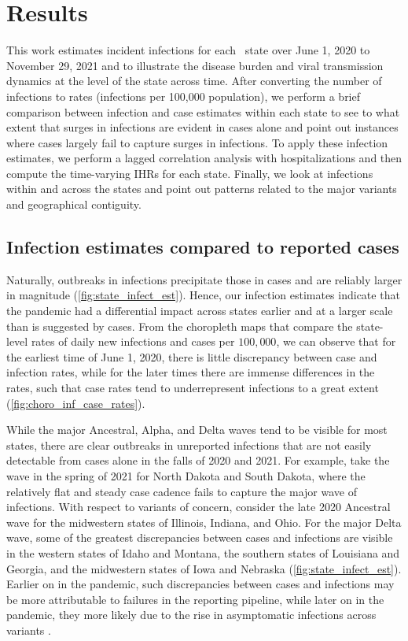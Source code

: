 \documentclass{article}
\begin{document}
\section{Results}

This work estimates incident infections for each \US\ state over June 1,
2020 to November 29, 2021 and to illustrate the disease burden and viral
transmission dynamics at the level of the state across time. After converting the number
of infections to rates (infections per 100,000 population), we perform a
brief comparison between infection and case estimates within each state to see
to what extent that surges in infections are evident in cases alone
and point out instances where cases largely fail to capture surges in infections.
To apply these infection estimates, we perform a lagged correlation analysis
with hospitalizations and then compute the time-varying IHRs for each state.
Finally, we look at infections within and across the states and point out patterns related
 to the major variants and geographical contiguity.

\subsection{Infection estimates compared to reported cases}

Naturally, outbreaks in infections precipitate those in cases and are reliably larger in
magnitude (\autoref{fig:state_infect_est}).
Hence, our infection estimates indicate
that the pandemic had a differential impact across states earlier and at a larger scale
than is suggested by cases. From the choropleth maps that compare the state-level rates 
of daily new infections and cases per $100,000$, we can observe
that for the earliest time of June 1, 2020, there is little discrepancy between case
and infection rates, while for the later times there are immense differences in the
rates, such that case rates tend to underrepresent infections to a great extent 
(\autoref{fig:choro_inf_case_rates}).

While the major Ancestral, Alpha, and Delta waves tend to be
visible for most states, there are clear outbreaks in unreported infections 
that are not easily detectable from cases alone in the 
falls of 2020 and 2021. For example, take the wave in the spring of 2021 for North Dakota and
South Dakota, where the relatively flat and steady case cadence fails to capture the major 
wave of infections. With respect to variants of concern, consider the late 2020 Ancestral 
wave for the midwestern states of Illinois, Indiana, and Ohio. For the major Delta wave, some
 of the greatest discrepancies between cases and infections are visible in the western states 
 of Idaho and Montana, the southern states of Louisiana and Georgia, and the midwestern 
 states of Iowa and Nebraska (\autoref{fig:state_infect_est}). Earlier on in the pandemic, such 
 discrepancies between cases and infections may be more attributable to failures in the reporting 
 pipeline, while later on in the pandemic, they more likely due to the rise in asymptomatic infections
across variants \citep{oph2022covid, garrett2022high}. 
\end{document}
